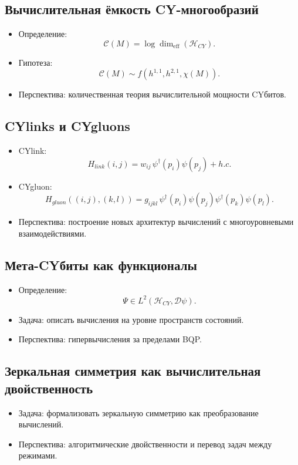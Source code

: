 \documentclass[12pt,a4paper]{article}
\begin{document}
\subsection{Вычислительная ёмкость CY-многообразий}
\begin{itemize}
\item Определение:
\[
\mathcal{C}(M) = \log \dim_{\mathrm{eff}}(\mathcal{H}_{CY}).
\]
\item Гипотеза:
\[
\mathcal{C}(M) \sim f(h^{1,1}, h^{2,1}, \chi(M)).
\]
\item Перспектива: количественная теория вычислительной мощности CYбитов.  
\end{itemize}

\subsection{CYlinks и CYgluons}
\begin{itemize}
\item CYlink:
\[
H_{link}(i,j) = w_{ij}\,\psi^\dagger(p_i)\psi(p_j) + h.c.
\]
\item CYgluon:
\[
H_{gluon}((i,j),(k,l)) = g_{ijkl}\,\psi^\dagger(p_i)\psi(p_j)\psi^\dagger(p_k)\psi(p_l).
\]
\item Перспектива: построение новых архитектур вычислений с многоуровневыми взаимодействиями.  
\end{itemize}

\subsection{Мета-CYбиты как функционалы}
\begin{itemize}
\item Определение:
\[
\Psi \in L^2(\mathcal{H}_{CY}, \mathcal{D}\psi).
\]
\item Задача: описать вычисления на уровне пространств состояний.  
\item Перспектива: гипервычисления за пределами BQP.  
\end{itemize}

\subsection{Зеркальная симметрия как вычислительная двойственность}
\begin{itemize}
\item Задача: формализовать зеркальную симметрию как преобразование вычислений.  
\item Перспектива: алгоритмические двойственности и перевод задач между режимами.  
\end{itemize}
\end{document}
